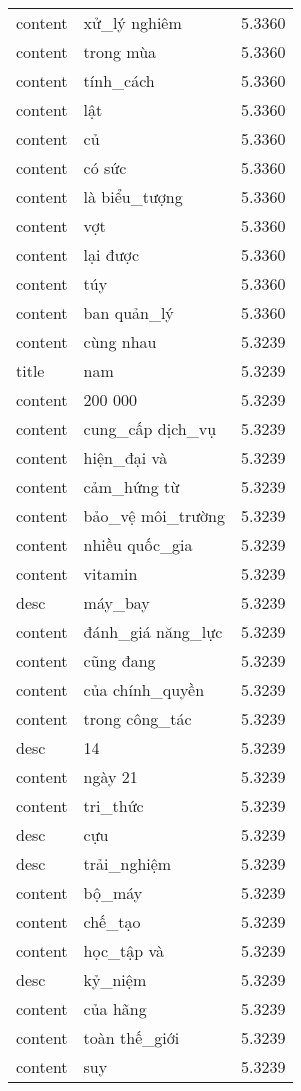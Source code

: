 \documentclass{article}
\begin{document}
\begin{tabular}{lll}
content & xử\_lý nghiêm & 5.3360\\
content & trong mùa & 5.3360\\
content & tính\_cách & 5.3360\\
content & lật & 5.3360\\
content & củ & 5.3360\\
content & có sức & 5.3360\\
content & là biểu\_tượng & 5.3360\\
content & vợt & 5.3360\\
content & lại được & 5.3360\\
content & túy & 5.3360\\
content & ban quản\_lý & 5.3360\\
content & cùng nhau & 5.3239\\
title & nam & 5.3239\\
content & 200 000 & 5.3239\\
content & cung\_cấp dịch\_vụ & 5.3239\\
content & hiện\_đại và & 5.3239\\
content & cảm\_hứng từ & 5.3239\\
content & bảo\_vệ môi\_trường & 5.3239\\
content & nhiều quốc\_gia & 5.3239\\
content & vitamin & 5.3239\\
desc & máy\_bay & 5.3239\\
content & đánh\_giá năng\_lực & 5.3239\\
content & cũng đang & 5.3239\\
content & của chính\_quyền & 5.3239\\
content & trong công\_tác & 5.3239\\
desc & 14 & 5.3239\\
content & ngày 21 & 5.3239\\
content & tri\_thức & 5.3239\\
desc & cựu & 5.3239\\
desc & trải\_nghiệm & 5.3239\\
content & bộ\_máy & 5.3239\\
content & chế\_tạo & 5.3239\\
content & học\_tập và & 5.3239\\
desc & kỷ\_niệm & 5.3239\\
content & của hãng & 5.3239\\
content & toàn thế\_giới & 5.3239\\
content & suy & 5.3239\\

\end{tabular}
\end{document}
